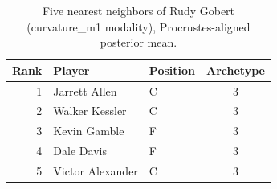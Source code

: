 \begin{table}[htbp]
  \centering\small
  \begin{tabular}{rllc}
    \toprule
    Rank & Player & Position & Archetype \\
    \midrule
    1 & Jarrett Allen & C & 3 \\
    2 & Walker Kessler & C & 3 \\
    3 & Kevin Gamble & F & 3 \\
    4 & Dale Davis & F & 3 \\
    5 & Victor Alexander & C & 3 \\
    \bottomrule
  \end{tabular}
  \caption{Five nearest neighbors of Rudy Gobert (curvature_m1 modality), Procrustes-aligned posterior mean.}
  \label{tab:Rudy_Gobert_neighbors_curvature_m1}
\end{table}

